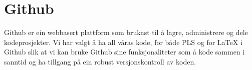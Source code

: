 \chapter{Github}
\thispagestyle{fancy}

Github er ein webbasert plattform som brukast til å lagre, administrere og dele kodeprosjekter. 
Vi har valgt å ha all våras kode, for både PLS og for LaTeX i Github slik at vi kan bruke Github sine funksjonaliteter som å kode sammen i sanntid og ha tillgang på ein robust versjonskontroll av koden.


